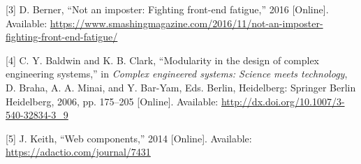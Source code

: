 \hypertarget{ref-Berner2016}{}
{[}3{]} D. Berner, ``Not an imposter: Fighting front-end fatigue,'' 2016
{[}Online{]}. Available:
\url{https://www.smashingmagazine.com/2016/11/not-an-imposter-fighting-front-end-fatigue/}

\hypertarget{ref-Baldwin2006}{}
{[}4{]} C. Y. Baldwin and K. B. Clark, ``Modularity in the design of
complex engineering systems,'' in \emph{Complex engineered systems:
Science meets technology}, D. Braha, A. A. Minai, and Y. Bar-Yam, Eds.
Berlin, Heidelberg: Springer Berlin Heidelberg, 2006, pp. 175--205
{[}Online{]}. Available: \url{http://dx.doi.org/10.1007/3-540-32834-3_9}

\hypertarget{ref-Keith2014}{}
{[}5{]} J. Keith, ``Web components,'' 2014 {[}Online{]}. Available:
\url{https://adactio.com/journal/7431}
